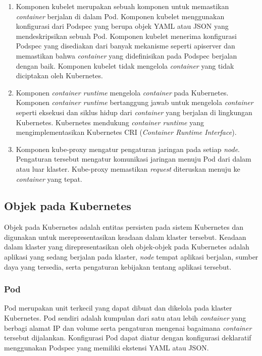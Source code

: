 \begin{enumerate}
  
  \item Komponen kubelet merupakan sebuah komponen untuk memastikan \emph{container} berjalan di dalam Pod.
    Komponen kubelet menggunakan konfigurasi dari Podspec yang berupa objek YAML atau JSON yang mendeskripsikan
    sebuah Pod. Komponen kubelet menerima konfigurasi Podspec yang disediakan dari banyak mekanisme seperti
    apiserver dan memastikan bahwa \emph{container} yang didefinisikan pada Podspec berjalan dengan baik. Komponen kubelet
    tidak mengelola \emph{container} yang tidak diciptakan oleh Kubernetes.

  \item Komponen \emph{container runtime} mengelola \emph{container} pada Kubernetes. Komponen \emph{container runtime}
    bertanggung jawab untuk mengelola \emph{container} seperti eksekusi dan siklus hidup dari \emph{container} yang berjalan
    di lingkungan Kubernetes. Kubernetes mendukung \emph{container runtime} yang mengimplementasikan Kubernetes
    CRI (\emph{Container Runtime Interface}).

  \item Komponen kube-proxy mengatur pengaturan jaringan pada setiap \emph{node}. Pengaturan tersebut mengatur komunikasi
    jaringan menuju Pod dari dalam atau luar klaster. Kube-proxy memastikan \emph{request} diteruskan menuju ke
    \emph{container} yang tepat.

\end{enumerate}

\subsection{Objek pada Kubernetes}

Objek pada Kubernetes adalah entitas persisten pada sistem Kubernetes dan digunakan untuk
merepresentasikan keadaan dalam klaster tersebut. Keadaan dalam klaster yang direpresentasikan
oleh objek-objek pada Kubernetes adalah aplikasi yang sedang berjalan pada klaster, \emph{node}
tempat aplikasi berjalan, sumber daya yang tersedia, serta pengaturan kebijakan tentang aplikasi
tersebut.

\subsubsection{Pod}

Pod merupakan unit terkecil yang dapat dibuat dan dikelola pada klaster Kubernetes. Pod sendiri adalah
kumpulan dari satu atau lebih \emph{container} yang berbagi alamat IP dan volume serta
pengaturan mengenai bagaimana \emph{container} tersebut dijalankan. Konfigurasi Pod dapat
diatur dengan konfigurasi deklaratif menggunakan Podspec yang memiliki ekstensi YAML atau JSON.

